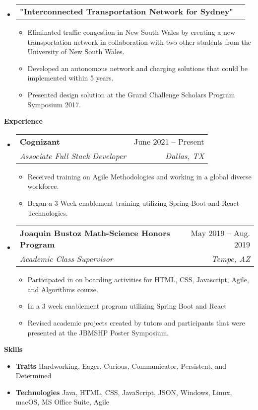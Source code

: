 \documentclass[letterpaper,12pt]{article}[leftmargin=*]
\makeatletter
\def \entryspacing {-0pt}
\renewcommand{\section}[2]{\vspace{5pt}
  \colorbox{secondary}{\color{white}\raggedbottom\normalsize\textbf{{#1}{\hspace{7pt}#2}}}
}
\newcommand{\resumeEntryStart}{\begin{itemize}[leftmargin=2.5mm]}
\newcommand{\resumeEntryEnd}{\end{itemize}\vspace{\entryspacing}}
\newcommand{\resumeItemListStart}{\begin{itemize}[leftmargin=4.5mm]}
\newcommand{\resumeItemListEnd}{\end{itemize}}
\newcommand{\resumeItem}[1]{
  \item\small{
    {#1 \vspace{-2pt}}
  }
}
\newcommand{\resumeEntryTSDL}[4]{
  \vspace{-1pt}\item[]
    \begin{tabularx}{0.97\textwidth}{X@{\hspace{60pt}}r}
      \textbf{\color{primary}#1} & {\firabook\color{accent}\small#2} \\
      \textit{\color{accent}\small#3} & \textit{\color{accent}\small#4} \\
    \end{tabularx}\vspace{-6pt}
}
\newcommand{\resumeEntryTD}[2]{
  \vspace{-1pt}\item[]
    \begin{tabularx}{0.97\textwidth}{X@{\hspace{60pt}}r}
      \textbf{\color{primary}#1} & {\firabook\color{accent}\small#2} \\
    \end{tabularx}\vspace{-6pt}
}
\newcommand{\resumeEntryS}[2]{
  \item[]\small{
    \textbf{\color{primary}#1 }{ #2 \vspace{-6pt}}
  }
}
\makeatother
\begin{document}
  \resumeEntryStart
    \resumeEntryTD
      {"Interconnected Transportation Network for Sydney"}{}
    \resumeItemListStart
      \resumeItem {Eliminated traffic congestion in New South Wales by creating a new transportation network in collaboration with two other students from the University of New South Wales.}
            \resumeItem {Developed an autonomous network and charging solutions that could be implemented within 5 years.}
                  \resumeItem {Presented design solution at the Grand Challenge Scholars Program Symposium 2017.}
    \resumeItemListEnd
  \resumeEntryEnd
  

\section{\faPieChart}{Experience}

  \resumeEntryStart
    \resumeEntryTSDL
      {Cognizant}{June 2021 -- Present}
      {Associate Full Stack Developer}{Dallas, TX}
    \resumeItemListStart
      \resumeItem {Received training on Agile Methodologies and working in a global diverse workforce.}
      \resumeItem {Began a 3 Week enablement training utilizing Spring Boot and React Technologies.}
    \resumeItemListEnd
  \resumeEntryEnd

  \resumeEntryStart
    \resumeEntryTSDL
      {Joaquin Bustoz Math-Science Honors Program}{May 2019 -- Aug. 2019}
      {Academic Class Supervisor}{Tempe, AZ}
    \resumeItemListStart
      \resumeItem {Participated in on boarding activities for HTML,  CSS,  Javascript,  Agile,  and Algorithms course.}
      \resumeItem {In a 3 week enablement program utilizing Spring Boot and React}
      \resumeItem {Revised academic projects created by tutors and participants that were presented at the JBMSHP Poster Symposium.}
    \resumeItemListEnd
  \resumeEntryEnd
  
\section{\faGears}{Skills}
 \resumeEntryStart
  \resumeEntryS{Traits } {Hardworking, Eager, Curious, Communicator, Persistent,  and Determined }
  \resumeEntryS{Technologies } {Java, HTML, CSS, JavaScript,  JSON,  Windows, Linux, macOS, MS Office Suite, Agile}
 \resumeEntryEnd
\end{document}

